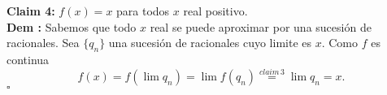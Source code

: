 \vspace{0.5cm}
\textbf{Claim 4:} $f(x)= x$ para todos $x$ real positivo.\\
\textbf{Dem :} Sabemos que todo $x$ real se puede aproximar por una sucesión de racionales. Sea $\{q_n\}$ una sucesión de racionales cuyo limite es $x$. Como $f$ es continua
\[
f(x) = f(\lim q_n) = \lim f(q_n)\stackrel{claim\,3}{=} \lim q_n = x.
\]
$\square$
